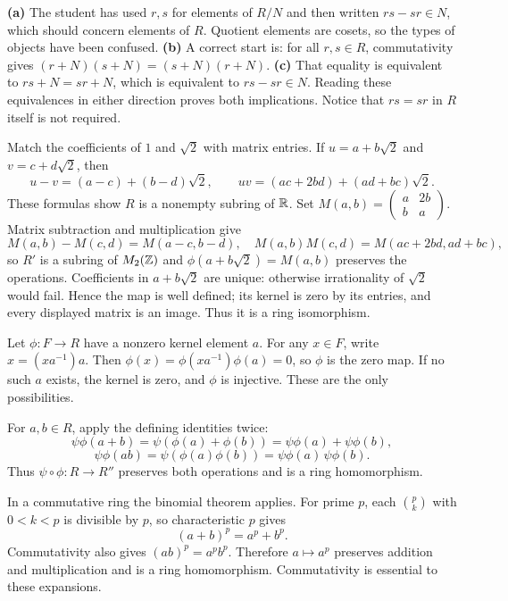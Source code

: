 \textbf{(a)} The student has used $r,s$ for elements of $R/N$ and then written $rs-sr\in N$, which should concern elements of $R$. Quotient elements are cosets, so the types of objects have been confused.
\textbf{(b)} A correct start is: for all $r,s\in R$, commutativity gives $(r+N)(s+N)=(s+N)(r+N)$.
\textbf{(c)} That equality is equivalent to $rs+N=sr+N$, which is equivalent to $rs-sr\in N$. Reading these equivalences in either direction proves both implications. Notice that $rs=sr$ in $R$ itself is not required.

\idea Match the coefficients of $1$ and $\sqrt2$ with matrix entries.
If $u=a+b\sqrt2$ and $v=c+d\sqrt2$, then
\[u-v=(a-c)+(b-d)\sqrt2,\qquad uv=(ac+2bd)+(ad+bc)\sqrt2.\]
These formulas show $R$ is a nonempty subring of $\mathbb{R}$. Set $M(a,b)=\begin{pmatrix}a&2b\\b&a\end{pmatrix}$. Matrix subtraction and multiplication give
\[M(a,b)-M(c,d)=M(a-c,b-d),\quad M(a,b)M(c,d)=M(ac+2bd,ad+bc),\]
so $R'$ is a subring of $M_2(\mathbb{Z})$ and $\phi(a+b\sqrt2)=M(a,b)$ preserves the operations. Coefficients in $a+b\sqrt2$ are unique: otherwise irrationality of $\sqrt2$ would fail. Hence the map is well defined; its kernel is zero by its entries, and every displayed matrix is an image. Thus it is a ring isomorphism.

Let $\phi:F\to R$ have a nonzero kernel element $a$. For any $x\in F$, write $x=(xa^{-1})a$. Then $\phi(x)=\phi(xa^{-1})\phi(a)=0$, so $\phi$ is the zero map. If no such $a$ exists, the kernel is zero, and $\phi$ is injective. These are the only possibilities.

For $a,b\in R$, apply the defining identities twice:
\[\psi\phi(a+b)=\psi(\phi(a)+\phi(b))=\psi\phi(a)+\psi\phi(b),\]
\[\psi\phi(ab)=\psi(\phi(a)\phi(b))=\psi\phi(a)\,\psi\phi(b).\]
Thus $\psi\circ\phi:R\to R''$ preserves both operations and is a ring homomorphism.

In a commutative ring the binomial theorem applies. For prime $p$, each $\binom pk$ with $0<k<p$ is divisible by $p$, so characteristic $p$ gives
\[(a+b)^p=a^p+b^p.\]
Commutativity also gives $(ab)^p=a^pb^p$. Therefore $a\mapsto a^p$ preserves addition and multiplication and is a ring homomorphism. Commutativity is essential to these expansions.

